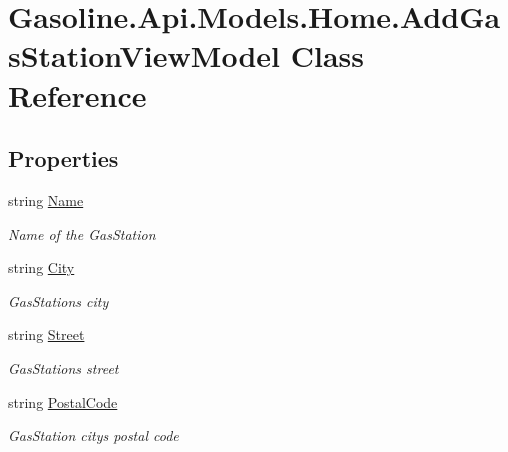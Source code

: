 \hypertarget{class_gasoline_1_1_api_1_1_models_1_1_home_1_1_add_gas_station_view_model}{}\section{Gasoline.\+Api.\+Models.\+Home.\+Add\+Gas\+Station\+View\+Model Class Reference}
\label{class_gasoline_1_1_api_1_1_models_1_1_home_1_1_add_gas_station_view_model}
\subsection*{Properties}
\begin{DoxyCompactItemize}
\item 
string \mbox{\hyperlink{class_gasoline_1_1_api_1_1_models_1_1_home_1_1_add_gas_station_view_model_a675c1c4c364d80cbcad8adab49c155c0}{Name}}
\begin{DoxyCompactList}\small\item\em Name of the Gas\+Station \end{DoxyCompactList}\item 
string \mbox{\hyperlink{class_gasoline_1_1_api_1_1_models_1_1_home_1_1_add_gas_station_view_model_a8e88b21baf27536f7c33528061f002e6}{City}}
\begin{DoxyCompactList}\small\item\em Gas\+Station\textquotesingle{}s city \end{DoxyCompactList}\item 
string \mbox{\hyperlink{class_gasoline_1_1_api_1_1_models_1_1_home_1_1_add_gas_station_view_model_a273ca6e2a04e2c845ee2caa14c1b12d2}{Street}}
\begin{DoxyCompactList}\small\item\em Gas\+Station\textquotesingle{}s street \end{DoxyCompactList}\item 
string \mbox{\hyperlink{class_gasoline_1_1_api_1_1_models_1_1_home_1_1_add_gas_station_view_model_a86d3ba6cdacfb5dbba4f88e9766d7252}{Postal\+Code}}
\begin{DoxyCompactList}\small\item\em Gas\+Station city\textquotesingle{}s postal code \end{DoxyCompactList}\end{DoxyCompactItemize}


